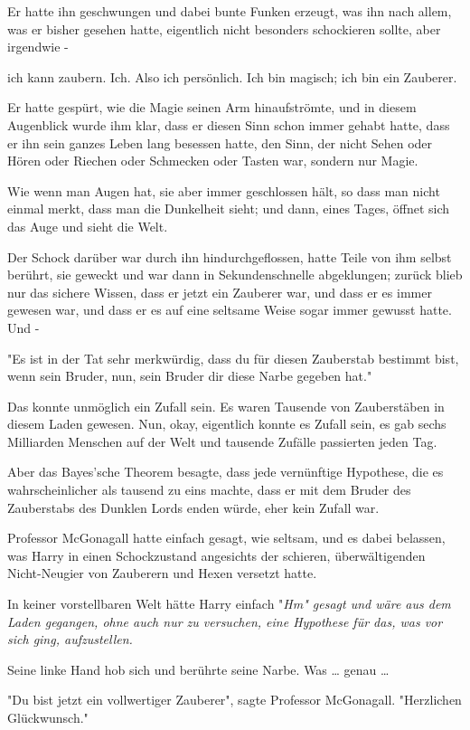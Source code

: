{Er hatte ihn geschwungen und dabei bunte Funken erzeugt, was ihn nach allem, was er bisher gesehen hatte, eigentlich nicht besonders schockieren sollte, aber irgendwie -

ich kann zaubern. Ich. Also ich persönlich. Ich bin magisch; ich bin ein Zauberer.

Er hatte gespürt, wie die Magie seinen Arm hinaufströmte, und in diesem Augenblick wurde ihm klar, dass er diesen Sinn schon immer gehabt hatte, dass er ihn sein ganzes Leben lang besessen hatte, den Sinn, der nicht Sehen oder Hören oder Riechen oder Schmecken oder Tasten war, sondern nur Magie.

Wie wenn man Augen hat, sie aber immer geschlossen hält, so dass man nicht einmal merkt, dass man die Dunkelheit sieht; und dann, eines Tages, öffnet sich das Auge und sieht die Welt.

Der Schock darüber war durch ihn hindurchgeflossen, hatte Teile von ihm selbst berührt, sie geweckt und war dann in Sekundenschnelle abgeklungen; zurück blieb nur das sichere Wissen, dass er jetzt ein Zauberer war, und dass er es immer gewesen war, und dass er es auf eine seltsame Weise sogar immer gewusst hatte. Und -

"Es ist in der Tat sehr merkwürdig, dass du für diesen Zauberstab bestimmt bist, wenn sein Bruder, nun, sein Bruder dir diese Narbe gegeben hat."

Das konnte unmöglich ein Zufall sein. Es waren Tausende von Zauberstäben in diesem Laden gewesen. Nun, okay, eigentlich konnte es Zufall sein, es gab sechs Milliarden Menschen auf der Welt und tausende Zufälle passierten jeden Tag.

Aber das Bayes'sche Theorem besagte, dass jede vernünftige Hypothese, die es wahrscheinlicher als tausend zu eins machte, dass er mit dem Bruder des Zauberstabs des Dunklen Lords enden würde, eher kein Zufall war.

Professor McGonagall hatte einfach gesagt, wie seltsam, und es dabei belassen, was Harry in einen Schockzustand angesichts der schieren, überwältigenden Nicht-Neugier von Zauberern und Hexen versetzt hatte.

In keiner vorstellbaren Welt hätte Harry einfach "\emph{Hm" gesagt und wäre aus dem Laden gegangen, ohne auch nur zu versuchen, eine Hypothese für das, was vor sich ging, aufzustellen.}

Seine linke Hand hob sich und berührte seine Narbe. Was … genau …

"Du bist jetzt ein vollwertiger Zauberer", sagte Professor McGonagall. "Herzlichen Glückwunsch."

}
